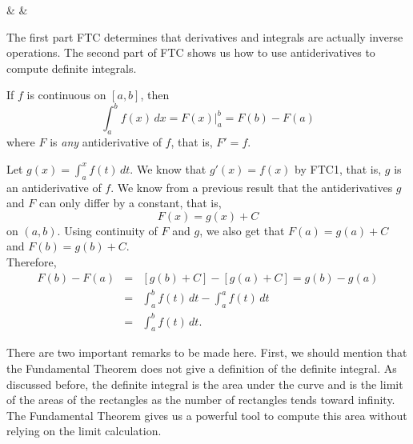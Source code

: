 \documentclass{book}
\newcommand{\dx}{\,dx}
\newcommand{\dt}{\,dt}
\newcommand{\dint}{\displaystyle \int}
\begin{document}
\begin{Videos}
 &
  &
\end{Videos}

The first part FTC determines that derivatives and integrals are actually inverse operations. The second part of FTC shows us how to use antiderivatives to compute definite integrals.

\begin{Thm} If $f$ is continuous on $[a,b]$, then \[\int_a^b f(x)\dx = F(x)\bigg\vert_a^b = F(b) - F(a)\] where $F$ is \emph{any} antiderivative of $f$, that is, $F'=f$.\end{Thm}
\begin{pf}
Let $g(x) = \dint_a^x f(t)\dt$. We know that $g'(x) = f(x)$ by FTC1, that is, $g$ is an antiderivative of $f$. We know from a previous result that the antiderivatives $g$ and $F$ can only differ by a constant, that is, \[F(x) = g(x) + C\] on $(a,b)$. Using continuity of $F$ and $g$, we also get that $F(a) = g(a) + C$ and $F(b) = g(b) +C$. \\

Therefore, 
\begin{eqnarray*}
F(b) - F(a) &=& [g(b)+C] - [g(a)+C]  = g(b) - g(a)\\
&=& \int_a^b f(t)\dt - \int_a^a f(t)\dt\\
&=& \int_a^b f(t)\dt.
\end{eqnarray*}  
\end{pf}\vs 

There are two important remarks to be made here. First, we should mention that  the Fundamental Theorem does not give  a definition of the definite integral. As discussed before, the definite integral is the area under the curve and is the limit of the areas of the rectangles as the number of rectangles tends toward infinity. The Fundamental Theorem gives us a powerful tool to compute this area without relying on the limit calculation. \\
\end{document}
